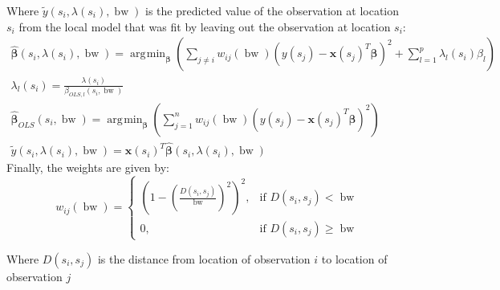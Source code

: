 \documentclass[10pt]{amsart}
\DeclareMathOperator*{\argmin}{\arg\!\min}
\DeclareMathOperator*{\bw}{\mbox{bw}}
\newcommand{\vect}[1]{\boldsymbol{#1}}
\begin{document}
		Where $\tilde{y}\left(s_i, \lambda(s_i), \bw \right)$ is the predicted value of the observation at location $s_i$ from the local model that was fit by leaving out the observation at location $s_i$:
		\begin{gather*}
			\hat{\vect{\beta}}\left(s_i, \lambda(s_i), \bw \right) = \argmin_{\vect{\beta}} \left( \sum_{j \neq i} w_{ij}(\bw)\left(y(s_j) - \vect{x}(s_j)^T \vect{\beta}\right)^2  +  \sum_{l=1}^p \lambda_{l}(s_i) \beta_l \right)\\
			\lambda_{l}(s_i) = \frac{\lambda(s_i)}{\beta_{OLS,l}(s_i, \bw)}\\
			\hat{\vect{\beta}}_{OLS}(s_i, \bw) = \argmin_{\vect{\beta}} \left( \sum_{j=1}^{n} w_{ij}(\bw)\left(y(s_j) - \vect{x}(s_j)^T \vect{\beta}\right)^2\right)\\
			\tilde{y}\left(s_i, \lambda(s_i), \bw \right) = \vect{x}(s_i)^T \hat{\vect{\beta}}\left(s_i, \lambda(s_i), \bw \right)
		\end{gather*}
		Finally, the weights are given by:
		\[
			w_{ij}(\bw) =  \begin{cases} \left(1-\left(\frac{D(s_i,s_j)}{\bw}\right)^2\right)^2, & \mbox{if } D(s_i,s_j) < \bw \\
			0, & \mbox{if }D(s_i,s_j) \ge \bw \end{cases}
		\]
		
		Where $D(s_i,s_j)$ is the distance from location of observation $i$ to location of observation $j$\\
		
\end{document}
